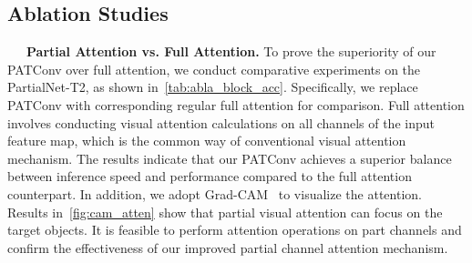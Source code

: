 \subsection{Ablation Studies}
\label{sec:ablation}
~~~\textbf{Partial Attention vs. Full Attention.}
To prove the superiority of our PATConv over full attention, we conduct comparative experiments on the PartialNet-T2, as shown in~\cref{tab:abla_block_acc}. Specifically, we replace PATConv with corresponding regular full attention for comparison. Full attention involves conducting visual attention calculations on all channels of the input feature map, which is the common way of conventional visual attention mechanism. The results indicate that our PATConv achieves a superior balance between inference speed and performance compared to the full attention counterpart. In addition, we adopt Grad-CAM~\cite{Selvaraju2017} to visualize the attention. Results in~\cref{fig:cam_atten} show that partial visual attention can focus on the target objects. It is feasible to perform attention operations on part channels and confirm the effectiveness of our improved partial channel attention mechanism.

\begin{table}[ht] \small
  \centering
  \caption{Comparison on PartialNet-T2 of partial attention (P), and full attention (F) on ImageNet-1K dataset. Where the ``ch", ``sp", and ``sf" denote channel-wise attention, spatial-wise attention, and self-attention respectively.}
  \label{tab:abla_block_acc}
\end{table}

